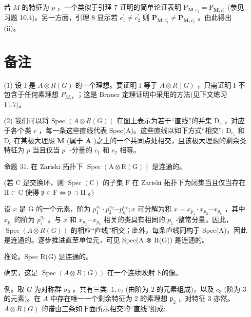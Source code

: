 \documentclass[10pt]{article}
\begin{document}
若 \(M\) 的特征为 \(p\) ，一个类似于引理 7 证明的简单论证表明 \({\mathrm{P}}_{\mathbf{M},{c}_{1}} = {\mathrm{P}}_{\mathbf{M},{c}_{1}^{\prime }}\) (参见习题 10.4)。另一方面，引理 8 显示若 \({c}_{1}^{\prime } \neq  {c}_{2}^{\prime }\) 则 \({\mathbf{P}}_{\mathbf{M},{c}_{1}^{\prime }} \neq  {\mathbf{P}}_{\mathbf{M},{c}_{2}^{\prime }}\) 。由此得出 (ii)。

\section*{备注}

(1) 设 I 是 \(A \otimes  R\left( G\right)\) 的一个理想。要证明 I 等于 \(A \otimes  R\left( G\right)\) ，只需证明 I 不包含于任何素理想 \({P}_{M,c}\) ；这是 Brauer 定理证明中采用的方法(见下文练习 11.7)。

(2) 我们可以将 Spec \(\left( {A \otimes  R\left( G\right) }\right)\) 在图上表示为若干“直线”的并集 \({\mathrm{D}}_{c}\) ，对应于各个类 \(c\) ，每一条这些直线代表 Spec(A)。这些直线以如下方式“相交”: \({\mathrm{D}}_{{c}_{1}}\) 和 \({\mathrm{D}}_{c}\) 在某极大理想 \(\mathbf{M}\) (属于 \(\mathbf{A}\) )之上的一个共同点处相交，且该极大理想的剩余类特征为 \(p\) 当且仅当 \({p}^{\prime }\) -分量的 \({c}_{1}\) 和 \({c}_{2}\) 相等。

命题 31. 在 Zariski 拓扑下 \(\operatorname{Spec}\left( {\mathrm{A} \otimes  \mathrm{R}\left( \mathrm{G}\right) }\right)\) 是连通的。

(若 \(\mathrm{C}\) 是交换环，则 \(\operatorname{Spec}\left( \mathrm{C}\right)\) 的子集 \(\mathrm{F}\) 在 Zariski 拓扑下为闭集当且仅当存在 \(\mathrm{H} \subset  \mathrm{C}\) 使得 \(\mathfrak{p} \in  \mathrm{F} \Leftrightarrow  \mathfrak{p} \supset  \mathrm{H}\) 。)

设 \(x\) 是 \(\mathrm{G}\) 的一个元素，阶为 \({p}_{1}^{{n}_{1}} \cdot  {p}_{2}^{{n}_{2}}\cdots {p}_{k}^{{n}_{k}};x\) 可分解为积 \(x = {x}_{{p}_{1}} \cdot  {x}_{{p}_{2}}\cdots {x}_{{p}_{k}}\) ，其中 \({x}_{{p}_{i}}\) 的阶为 \({p}_{i}^{{n}_{i}}\) 。与 \(x\) 和 \({x}_{{p}_{2}}\cdots {x}_{{p}_{k}}\) 相关的类具有相同的 \({p}_{1}\) -整常分量。因此， \(\operatorname{Spec}\left( {A \otimes  R\left( G\right) }\right)\) 的相应“直线”相交；此外，每条直线同构于 Spec(A)，因此是连通的。逐步推进直至单位元，可见 Spec(A ⊗ R(G)) 是连通的。

推论。Spec R(G) 是连通的。

确实，这是 \(\operatorname{Spec}\left( {A \otimes  R\left( G\right) }\right)\) 在一个连续映射下的像。

例。取 \(G\) 为对称群 \({\sigma }_{3}\) 。共有三类: \(1,{c}_{2}\) (由阶为 2 的元素组成)，以及 \({c}_{3}\) (阶为 3 的元素)。在 \(A\) 中存在唯一一个剩余特征为 2 的素理想 \({\mathfrak{p}}_{2}\) ，对特征 3 亦然。 \(A \otimes  R\left( G\right)\) 的谱由三条如下面所示相交的“直线”组成:
\end{document}
